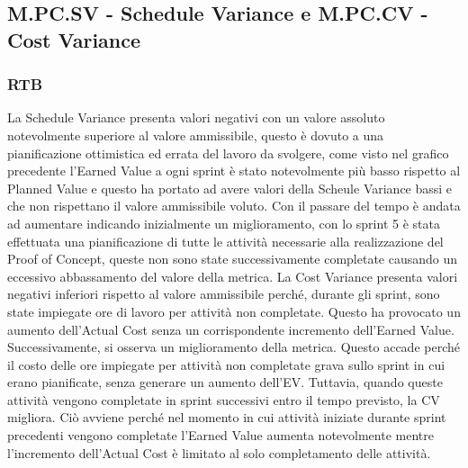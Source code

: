 \subsection{M.PC.SV - Schedule Variance e M.PC.CV - Cost Variance}

\subsubsection{RTB}
La Schedule Variance presenta valori negativi con un valore assoluto notevolmente superiore al valore ammissibile, questo è dovuto a una pianificazione
ottimistica ed errata del lavoro da svolgere, come visto nel grafico precedente l'Earned Value a ogni sprint è stato notevolmente più basso rispetto al Planned Value
e questo ha portato ad avere valori della Scheule Variance bassi e che non rispettano il valore ammissibile voluto.
Con il passare del tempo è andata ad aumentare indicando inizialmente un miglioramento, con lo sprint 5 è stata effettuata una pianificazione di tutte le attività
necessarie alla realizzazione del Proof of Concept, queste non sono state successivamente completate causando un eccessivo abbassamento del valore della metrica.
La Cost Variance presenta valori negativi inferiori rispetto al valore ammissibile perché, durante gli sprint, sono state impiegate ore di lavoro per attività non completate. 
Questo ha provocato un aumento dell'Actual Cost senza un corrispondente incremento dell'Earned Value.
Successivamente, si osserva un miglioramento della metrica. Questo accade perché il costo delle ore impiegate per attività non completate grava sullo sprint in cui erano pianificate, 
senza generare un aumento dell'EV. Tuttavia, quando queste attività vengono completate in sprint successivi entro il tempo previsto, la CV migliora.
Ciò avviene perché nel momento in cui attività iniziate durante sprint precedenti vengono completate l'Earned Value aumenta notevolmente mentre l'incremento dell'Actual Cost è limitato al solo completamento delle attività.
